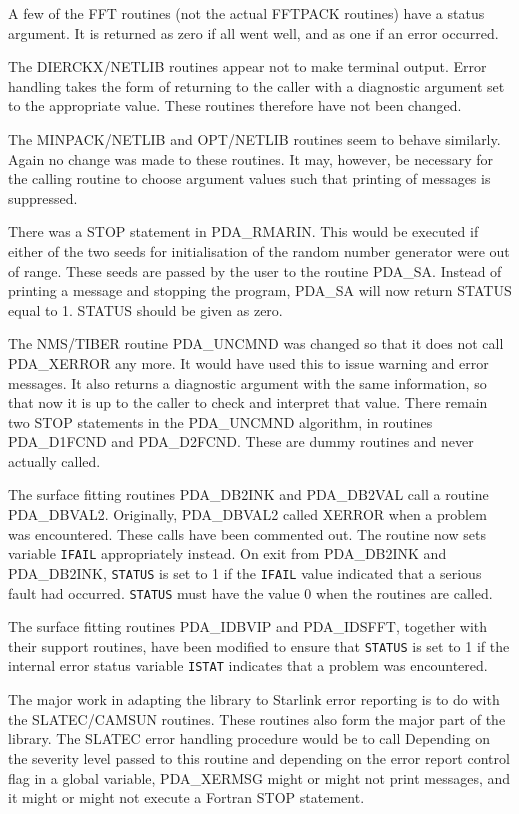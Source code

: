    A few of the FFT routines (not the actual FFTPACK routines) have a
   status argument. It is returned as zero if all went well, and as one
   if an error occurred.

   The DIERCKX/NETLIB routines appear not to make terminal output. Error
   handling takes the form of returning to the caller with a diagnostic
   argument set to the appropriate value. These routines therefore have
   not been changed.

   The MINPACK/NETLIB and OPT/NETLIB routines seem to behave similarly.
   Again no change was made to these routines. It may, however, be
   necessary for the calling routine to choose argument values such that
   printing of messages is suppressed.

   There was a STOP statement in PDA\_RMARIN. This would be executed if
   either of the two seeds for initialisation of the random number
   generator were out of range. These seeds are passed by the user to
   the routine PDA\_SA. Instead of printing a message and stopping the
   program, PDA\_SA will now return STATUS equal to 1. STATUS should
   be given as zero.

   The NMS/TIBER routine PDA\_UNCMND was changed so that it does not
   call PDA\_XERROR any more. It would have used this to issue warning
   and error messages. It also returns a diagnostic argument with the
   same information, so that now it is up to the caller to check and
   interpret that value. There remain two STOP statements in the
   PDA\_UNCMND algorithm, in routines PDA\_D1FCND and PDA\_D2FCND. These
   are dummy routines and never actually called.

The surface fitting routines PDA\_DB2INK and PDA\_DB2VAL call a 
routine PDA\_DBVAL2. Originally, PDA\_DBVAL2 called XERROR when a 
problem was encountered. These calls have been commented out. The 
routine now sets variable {\tt IFAIL} appropriately instead. On exit from 
PDA\_DB2INK and PDA\_DB2INK, {\tt STATUS} is set to 1 if the 
{\tt IFAIL} value indicated that a serious fault had occurred. 
{\tt STATUS} must have the 
value 0 when the routines are called.
  
The surface fitting routines PDA\_IDBVIP and PDA\_IDSFFT, together
with their support routines, have been modified to ensure that {\tt STATUS}
is set to 1 if the internal error status variable {\tt ISTAT} indicates
that a problem was encountered.

   The major work in adapting the library to Starlink error reporting is
   to do with the SLATEC/\-CAMSUN routines. These routines also form the
   major part of the library. The SLATEC error handling procedure would
   be to call
   Depending on the severity level passed to this routine and depending
   on the error report control flag in a global variable, PDA\_XERMSG might
   or might not print messages, and it might or might not execute a
   Fortran STOP statement.

